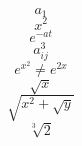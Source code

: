 \documentclass{article}
\begin{document}
$$a_1$$
$$x^{2}$$
$$e^{-at}$$
$$a_{ij}^{3}$$
$$e^{x^{2}}\neq{e^{2x}}$$
$$\sqrt{x}$$
$$\sqrt{x^2+\sqrt{y}}$$
$$\sqrt[3]{2}$$
\end{document}
